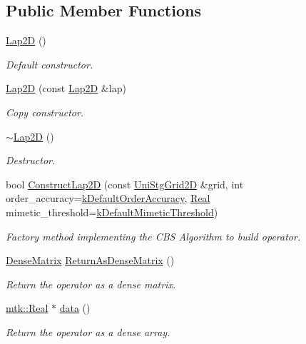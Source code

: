 \subsection*{Public Member Functions}
\begin{DoxyCompactItemize}
\item 
\hyperlink{classmtk_1_1Lap2D_ada4370fb8d7726e70a3257e3841c6d1f}{Lap2\+D} ()
\begin{DoxyCompactList}\small\item\em Default constructor. \end{DoxyCompactList}\item 
\hyperlink{classmtk_1_1Lap2D_acf62bf6a1c041e4b02f06346054d7af2}{Lap2\+D} (const \hyperlink{classmtk_1_1Lap2D}{Lap2\+D} \&lap)
\begin{DoxyCompactList}\small\item\em Copy constructor. \end{DoxyCompactList}\item 
\hyperlink{classmtk_1_1Lap2D_a8ca8447a4da7a5ddcf826486992374a5}{$\sim$\+Lap2\+D} ()
\begin{DoxyCompactList}\small\item\em Destructor. \end{DoxyCompactList}\item 
bool \hyperlink{classmtk_1_1Lap2D_a188ee8fee643463affca7de2884711b1}{Construct\+Lap2\+D} (const \hyperlink{classmtk_1_1UniStgGrid2D}{Uni\+Stg\+Grid2\+D} \&grid, int order\+\_\+accuracy=\hyperlink{group__c01-roots_ga0d95560098eb36420511103637b6952f}{k\+Default\+Order\+Accuracy}, \hyperlink{group__c01-roots_gac080bbbf5cbb5502c9f00405f894857d}{Real} mimetic\+\_\+threshold=\hyperlink{group__c01-roots_ga35718d949bdc81a08a9cc8ebbe3478a2}{k\+Default\+Mimetic\+Threshold})
\begin{DoxyCompactList}\small\item\em Factory method implementing the C\+B\+S Algorithm to build operator. \end{DoxyCompactList}\item 
\hyperlink{classmtk_1_1DenseMatrix}{Dense\+Matrix} \hyperlink{classmtk_1_1Lap2D_af23266b8f7b31b0da7a9480fbaca0cac}{Return\+As\+Dense\+Matrix} ()
\begin{DoxyCompactList}\small\item\em Return the operator as a dense matrix. \end{DoxyCompactList}\item 
\hyperlink{group__c01-roots_gac080bbbf5cbb5502c9f00405f894857d}{mtk\+::\+Real} $\ast$ \hyperlink{classmtk_1_1Lap2D_a686853fb66c8ed4b05034c151bd22604}{data} ()
\begin{DoxyCompactList}\small\item\em Return the operator as a dense array. \end{DoxyCompactList}\end{DoxyCompactItemize}
